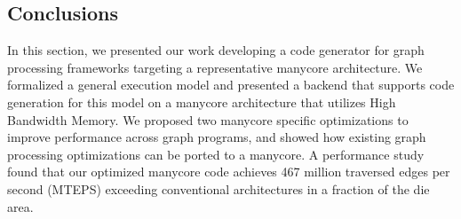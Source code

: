 \subsection{Conclusions}\label{sec:concl}

In this section, we presented our work developing a code generator for graph processing frameworks targeting a representative manycore architecture. 
We formalized a general execution model and presented a backend that supports code generation for this model on a manycore architecture that utilizes High Bandwidth Memory.
We proposed two manycore specific optimizations to improve performance across graph programs, and showed how existing graph processing optimizations can be ported to a manycore. 
A performance study found that our optimized manycore code achieves 467 million traversed edges per second (MTEPS) exceeding conventional architectures in a fraction of the die area.



